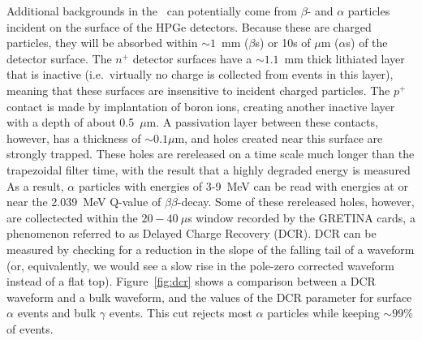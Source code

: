 \documentclass[/main.tex]{subfiles}
\begin{document}
Additional backgrounds in the \MJD\ can potentially come from $\beta$- and $\alpha$ particles incident on the surface of the HPGe detectors.
Because these are charged particles, they will be absorbed within ${\sim}1$~mm ($\beta$s) or 10s of $\mu$m ($\alpha$s) of the detector surface.
The $n^+$ detector surfaces have a ${\sim}1.1$~mm thick lithiated layer that is inactive (i.e.~virtually no charge is collected from events in this layer), meaning that these surfaces are insensitive to incident charged particles.
The $p^+$ contact is made by implantation of boron ions, creating another inactive layer with a depth of about 0.5~$\mu$m.
A passivation layer between these contacts, however, has a thickness of ${\sim}0.1 \mu$m, and holes created near this surface are strongly trapped.
These holes are rereleased on a time scale much longer than the trapezoidal filter time, with the result that a highly degraded energy is measured
As a result, $\alpha$ particles with energies of 3-9~MeV can be read with energies at or near the 2.039~MeV Q-value of $\beta\beta$-decay.
Some of these rereleased holes, however, are collectected within the $20-40~\mu$s window recorded by the GRETINA cards, a phenomenon referred to as Delayed Charge Recovery (DCR).
DCR can be measured by checking for a reduction in the slope of the falling tail of a waveform (or, equivalently, we would see a slow rise in the pole-zero corrected waveform instead of a flat top).
Figure~\ref{fig:dcr} shows a comparison between a DCR waveform and a bulk waveform, and the values of the DCR parameter for surface $\alpha$ events and bulk $\gamma$ events.
This cut rejects most $\alpha$ particles while keeping ${\sim}99\%$ of \znbb events.
\end{document}
